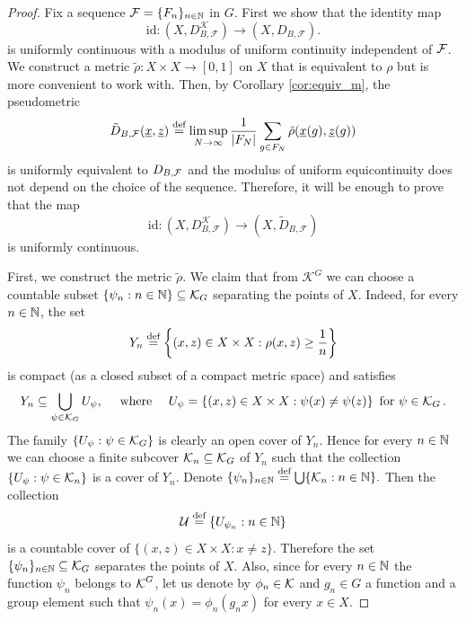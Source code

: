 \begin{proof}
Fix a \Folner sequence $\mathcal F=\{F_n\}_{n\in\mathbb{N}}$ in $G$. First we show that the identity map
\[
\textrm{id}\colon (X, D^\mathcal{K}_{B,\mathcal F})\to (X,D_{B,\mathcal F}).
\]
is uniformly continuous with a modulus of uniform continuity independent of $\operatorname{\mathcal{F}}$. We construct a metric $\tilde\rho: X\times X \to [0,1]$ on $X$ that is equivalent to $\rho$ but is more convenient to work with. Then, by Corollary \ref{cor:equiv_m}, the pseudometric 
\[
\tilde D_{B,\operatorname{\mathcal{F}}}(\underline x,\underline z)\stackrel{\textup{def}}{=}\limsup_{N\to\infty}\frac{1}{|F_N|}\sum_{g\in F_N}\tilde\rho(\underline{x}(g),\underline{z}(g))
\]
is uniformly equivalent to $D_{B,\operatorname{\mathcal{F}}}$ and the modulus of uniform equicontinuity does not depend on the choice of the \Folner sequence. Therefore, it will be enough to prove that the map
\[
\textrm{id}\colon (X, D^\mathcal{K}_{B,\mathcal F})\to (X,\tilde D_{B,\mathcal F})
\]
is uniformly continuous. 

First, we construct the metric $\tilde\rho$.
We claim that from $\mathcal{K}^G$ we can choose a countable subset $\{\psi_n: n\in\mathbb{N}\}\subseteq \mathcal{K}_G$ separating the points of $X$. Indeed, for every $n\in\mathbb{N}$, the set
\[
Y_n\stackrel{\textup{def}}{=} \left\{(x,z)\in X\times X: \rho(x,z)\geq \frac{1}{n} \right\}
\]
is compact (as a closed subset of a compact metric space) and satisfies
\[
Y_n \subseteq \bigcup_{\psi\in\operatorname{\mathcal{K}}_G} U_{\psi}, \quad\text{ where }\quad 
U_{\psi}=\left\{(x,z)\in X\times X: \psi(x)\neq \psi(z)\right\} \text{ for }\psi\in\operatorname{\mathcal{K}}_G.
\]
The family $\left\{ U_{\psi}:\psi\in\operatorname{\mathcal{K}}_G\right\}$ is clearly an open cover of $Y_n$.
Hence for every $n\in \mathbb{N}$ we can choose a finite subcover  $\operatorname{\mathcal{K}}_n\subseteq\operatorname{\mathcal{K}}_G$ of $Y_n$ such that the collection
$
\left\{U_{\psi}: \psi\in\operatorname{\mathcal{K}}_n\right\}
$
is a cover of $Y_n$. Denote 
$
\{\psi_n\}_{n\in\mathbb{N}}\stackrel{\textup{def}}{=} \bigcup\{\operatorname{\mathcal{K}}_n:n\in\mathbb{N}\}.
$
Then the collection 
\begin{equation}\label{eq:cover}
\operatorname{\mathcal{U}}\stackrel{\textup{def}}{=}\left\{U_{\psi_n}: n\in\mathbb{N}\right\}
\end{equation}
is a countable cover of $\{(x,z) \in X\times X: x\neq z\}$. Therefore the set $\{\psi_n\}_{n\in\mathbb{N}}\subseteq\operatorname{\mathcal{K}}_G$ separates the points of $X$.
%
Also, since for every $n\in \mathbb{N}$ the function $\psi_n$ belongs to $\operatorname{\mathcal{K}}^G$, let us denote by $\phi_n\in \operatorname{\mathcal{K}}$ and $g_n \in G$ a function and a group element such that $\psi_n(x)= \phi_n(g_nx)$ for every $x\in X$.




\end{proof}
